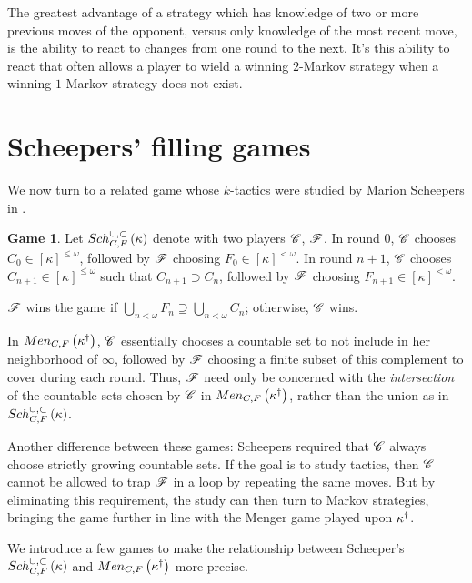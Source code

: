 \documentclass{amsart}
\theoremstyle{definition}
\newtheorem{game}[theorem]{Game}
\begin{document}
The greatest advantage of a strategy which has knowledge of two or more previous
moves of the opponent, versus only knowledge of the most recent move, is the
ability to react to changes from one round to the next. It's this ability to
react that often allows a player to wield a winning \(2\)-Markov strategy when
a winning \(1\)-Markov strategy does not exist.

\section{Scheepers' filling games}

We now turn to a related game whose \(k\)-tactics were studied by Marion
Scheepers in \cite{MR1129143}.

\begin{game}
  Let \(Sch^{\cup,\subset}_{C,F}\left({\kappa}\right)\) denote
  with two players \(\mathscr{C}\), \(\mathscr{F}\). In round \(0\), \(\mathscr{C}\) chooses
  \(C_0\in[\kappa]^{\leq\omega}\), followed by \(\mathscr{F}\) choosing
  \(F_0\in[\kappa]^{<\omega}\). In round \(n+1\), \(\mathscr{C}\) chooses
  \(C_{n+1}\in[\kappa]^{\leq\omega}\) such that \(C_{n+1}\supset C_n\), followed
  by \(\mathscr{F}\) choosing \(F_{n+1}\in[\kappa]^{<\omega}\).

  \(\mathscr{F}\) wins the game if
  \(\bigcup_{n<\omega} F_n\supseteq\bigcup_{n<\omega} C_n\); otherwise,
  \(\mathscr{C}\) wins.
\end{game}

In \(Men_{C,F}\left({\kappa^\dagger}\right)\), \(\mathscr{C}\) essentially chooses a countable set
to not include in her neighborhood of \(\infty\), followed by \(\mathscr{F}\) choosing
a finite subset of this complement to cover during each round. Thus,
\(\mathscr{F}\) need only be concerned with the \textit{intersection} of the
countable sets chosen by \(\mathscr{C}\) in \(Men_{C,F}\left({\kappa^\dagger}\right)\), rather
than the union as in \(Sch^{\cup,\subset}_{C,F}\left({\kappa}\right)\).

Another difference between these games:
Scheepers required that \(\mathscr{C}\) always choose strictly
growing countable sets. If the goal is to study tactics,
then \(\mathscr{C}\) cannot be allowed to trap \(\mathscr{F}\) in a loop by
repeating the same
moves. But by eliminating this requirement, the study can then turn to Markov
strategies, bringing the game further in line with the Menger game played upon
\(\kappa^\dagger\).

We introduce a few games to make the relationship between Scheeper's
\(Sch^{\cup,\subset}_{C,F}\left({\kappa}\right)\) and \(Men_{C,F}\left({\kappa^\dagger}\right)\) more precise.
\end{document}
